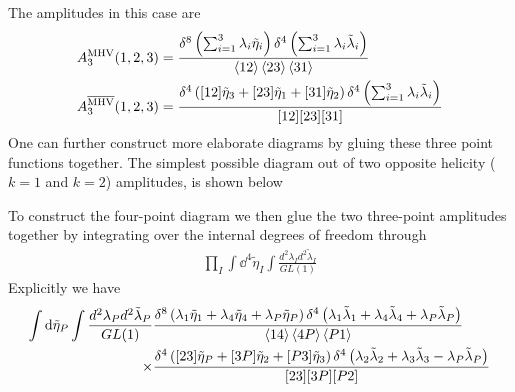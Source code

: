 \documentclass[letter,11pt]{article}
\begin{document}
The amplitudes in this case are
\begin{equation}
	\begin{aligned}
		A_3^{\text{MHV}}(1,2,3)&=\frac{\delta^{8}\left(\sum_{i=1}^{3}\lambda_i\tilde\eta_i\right)\delta^{4}\left(\sum_{i=1}^{3}\lambda_i\tilde\lambda_i\right)}{\expval{12}\expval{23}\expval{31}}\\
		A_3^{\overline{\text{MHV}}}(1,2,3)&=\frac{\delta^{4}\left([12]\tilde\eta_3+[23]\tilde\eta_1+[31]\tilde\eta_2\right)\delta^{4}\left(\sum_{i=1}^{3}\lambda_i\tilde\lambda_i\right)}{[12][23][31]}\\
	\end{aligned}
\end{equation}
One can further construct more elaborate diagrams by gluing these three point functions together.
The simplest possible diagram out of two opposite helicity ($k=1$ and $k=2$) amplitudes, is shown below
\begin{figure}[H]\centering\hspace*{3cm}
\end{figure}
To construct the four-point diagram we then glue the two three-point amplitudes together by integrating over the internal degrees of freedom through
\begin{equation}
	\begin{aligned}
		\prod_{I}\int \dd^4 \tilde \eta_I \int\frac{d^2\lambda_Id^2\tilde\lambda_I}{GL(1)}
	\end{aligned}
\end{equation}
Explicitly we have
\begin{equation}
	\begin{aligned}
		\int \dd \tilde \eta_{P} \int\frac{d^2\lambda_Pd^2\tilde\lambda_P}{GL(1)}&
		\frac{\delta^{8}\left(\lambda_1\tilde\eta_1+\lambda_{4}\tilde\eta_{4}+\lambda_{P}\tilde\eta_{P}\right)\delta^{4}\left(\lambda_{1}\tilde\lambda_{1}+\lambda_{4}\tilde\lambda_{4}+\lambda_{P}\tilde\lambda_{P}\right)}{\expval{14}\expval{4P}\expval{P1}}\\
		\times&\frac{\delta^{4}\left([23]\tilde\eta_{P}+[3P]\tilde\eta_{2}+[P 3]\tilde\eta_{3}\right)\delta^{4}\left(\lambda_{2}\tilde\lambda_{2}+\lambda_{3}\tilde\lambda_{3}-\lambda_{P}\tilde\lambda_{P}
			\right)}{[23][3P][P2]}
	\end{aligned}
\end{equation}
\end{document}
